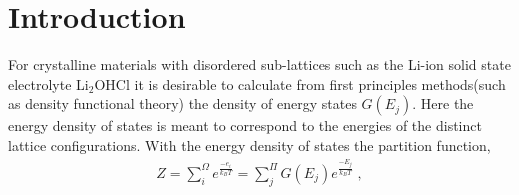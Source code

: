 \documentclass[aps,prl,reprint,superscriptaddress,showkeys]{revtex4-1}
\begin{document}
\section{Introduction}
For crystalline  materials  with disordered sub-lattices such as the Li-ion solid state electrolyte  Li$_2$OHCl\cite{Hood, Goodenough, Schwering, Holzwarth_group, Song_Borodin} it is desirable to calculate from first principles methods(such as density functional theory\cite{kohn:1965}) the density of energy states $G(E_j)$. Here the energy density of states is meant to correspond to the energies of the distinct lattice configurations. With the energy density of states the partition function,
\begin{equation}
\begin{split}
Z = \sum_{i}^{\Omega}e^{\frac{-e_i}{k_B T} }= \sum_{j}^{\Pi}G(E_j)e^{\frac{-E_j}{k_BT}} \;,
\end{split}
\label{partition}
\end{equation}
\end{document}
